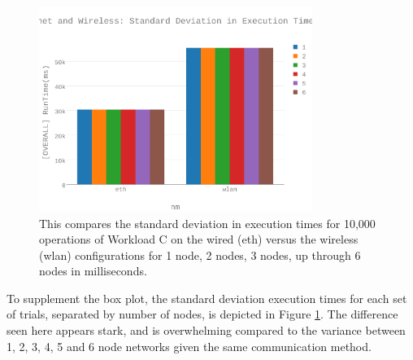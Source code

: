 \begin{figure}[h]
\includegraphics[width=3.5in]{Figures/figures-wlc_fig9.pdf}

\caption{This compares the standard deviation in execution times for 10,000 operations of Workload C on the wired (eth) versus the wireless (wlan) configurations for 1 node, 2 nodes, 3 nodes, up through 6 nodes in milliseconds.}

\label{fig:fig09}
\end{figure}

To supplement the box plot, the standard deviation execution times for each set of trials, separated by number of nodes, is depicted in Figure \ref{fig:fig09}.  The difference seen here appears stark, and is overwhelming compared to the variance between 1, 2, 3, 4, 5 and 6 node networks given the same communication method. 

